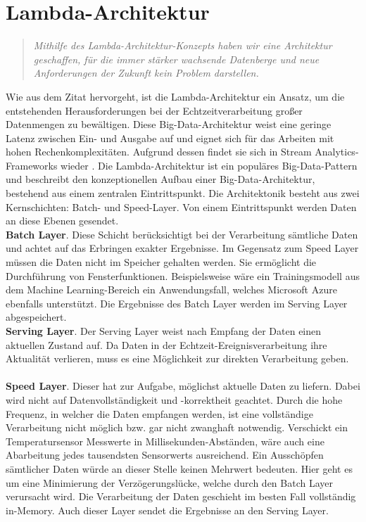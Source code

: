 \section{Lambda-Architektur}

\begin{quote} \textit{\glqq Mithilfe des Lambda-Architektur-Konzepts haben wir eine Architektur geschaffen, für die immer stärker wachsende Datenberge und neue Anforderungen der Zukunft kein Problem darstellen. \grqq~}\cite[S.2]{opitz.2017} \\ \end{quote} 
Wie aus dem Zitat hervorgeht, ist die Lambda-Architektur ein Ansatz, um die entstehenden Herausforderungen bei der Echtzeitverarbeitung großer Datenmengen zu bewältigen. Diese Big-Data-Architektur weist eine geringe Latenz zwischen Ein- und Ausgabe auf und eignet sich für das Arbeiten mit hohen Rechenkomplexitäten. Aufgrund dessen findet sie sich in Stream Analytics-Frameworks wieder \cite{Familiar.2017}. Die Lambda-Architektur ist ein populäres Big-Data-Pattern und beschreibt den konzeptionellen Aufbau einer Big-Data-Architektur, bestehend aus einem zentralen Eintrittspunkt. Die Architektonik besteht aus zwei Kernschichten: Batch- und Speed-Layer. Von einem Eintrittspunkt werden Daten an diese Ebenen gesendet.
\\ \textbf{Batch Layer}. Diese Schicht berücksichtigt bei der Verarbeitung sämtliche Daten und achtet auf das Erbringen exakter Ergebnisse. Im Gegensatz zum Speed Layer müssen die Daten nicht im Speicher gehalten werden. Sie ermöglicht die Durchführung von Fensterfunktionen. Beispielsweise wäre ein Trainingsmodell aus dem Machine Learning-Bereich ein Anwendungsfall, welches Microsoft Azure ebenfalls unterstützt. Die Ergebnisse des Batch Layer werden im Serving Layer abgespeichert.
\\ \textbf{Serving Layer}. Der Serving Layer weist nach Empfang der Daten einen aktuellen Zustand auf. Da Daten in der Echtzeit-Ereignisverarbeitung ihre Aktualität verlieren, muss es eine Möglichkeit zur direkten Verarbeitung geben.
\\ \\ \textbf{Speed Layer}. Dieser hat zur Aufgabe, möglichst aktuelle Daten zu liefern. Dabei wird nicht auf Datenvollständigkeit und -korrektheit geachtet. Durch die hohe Frequenz, in welcher die Daten empfangen werden, ist eine vollständige Verarbeitung nicht möglich bzw. gar nicht zwanghaft notwendig. Verschickt ein Temperatursensor Messwerte in Millisekunden-Abständen, wäre auch eine Abarbeitung jedes tausendsten Sensorwerts ausreichend. Ein Ausschöpfen sämtlicher Daten würde an dieser Stelle keinen Mehrwert bedeuten. Hier geht es um eine Minimierung der Verzögerungslücke, welche durch den Batch Layer verursacht wird. Die Verarbeitung der Daten geschieht im besten Fall vollständig in-Memory. Auch dieser Layer sendet die Ergebnisse an den Serving Layer. \\ 
